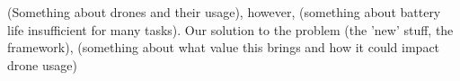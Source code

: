 (Something about drones and their usage), however, (something about battery life insufficient for many tasks). Our solution to the problem (the 'new' stuff, the framework), (something about what value this brings and how it could impact drone usage)
